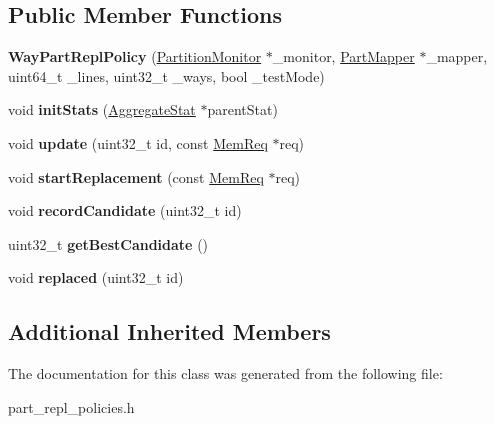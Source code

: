 \subsection*{Public Member Functions}
\begin{DoxyCompactItemize}
\item 
\hypertarget{classWayPartReplPolicy_a6f374286e7e738f7f76f47f87c171a3a}{{\bfseries Way\-Part\-Repl\-Policy} (\hyperlink{classPartitionMonitor}{Partition\-Monitor} $\ast$\-\_\-monitor, \hyperlink{classPartMapper}{Part\-Mapper} $\ast$\-\_\-mapper, uint64\-\_\-t \-\_\-lines, uint32\-\_\-t \-\_\-ways, bool \-\_\-test\-Mode)}\label{classWayPartReplPolicy_a6f374286e7e738f7f76f47f87c171a3a}

\item 
\hypertarget{classWayPartReplPolicy_a63b0823126e72f0ec951dde90c1a9977}{void {\bfseries init\-Stats} (\hyperlink{classAggregateStat}{Aggregate\-Stat} $\ast$parent\-Stat)}\label{classWayPartReplPolicy_a63b0823126e72f0ec951dde90c1a9977}

\item 
\hypertarget{classWayPartReplPolicy_a9372672c88cf0e53f9218836d760c8ff}{void {\bfseries update} (uint32\-\_\-t id, const \hyperlink{structMemReq}{Mem\-Req} $\ast$req)}\label{classWayPartReplPolicy_a9372672c88cf0e53f9218836d760c8ff}

\item 
\hypertarget{classWayPartReplPolicy_af2660add95f97c3e65e2e427c3c9c9fd}{void {\bfseries start\-Replacement} (const \hyperlink{structMemReq}{Mem\-Req} $\ast$req)}\label{classWayPartReplPolicy_af2660add95f97c3e65e2e427c3c9c9fd}

\item 
\hypertarget{classWayPartReplPolicy_a133e827b256bdd9485703968ebc6764e}{void {\bfseries record\-Candidate} (uint32\-\_\-t id)}\label{classWayPartReplPolicy_a133e827b256bdd9485703968ebc6764e}

\item 
\hypertarget{classWayPartReplPolicy_a1bc5d275de4abd8c9a91bcffefdab304}{uint32\-\_\-t {\bfseries get\-Best\-Candidate} ()}\label{classWayPartReplPolicy_a1bc5d275de4abd8c9a91bcffefdab304}

\item 
\hypertarget{classWayPartReplPolicy_ac1fd3a50f831294f63deebf5c078b98b}{void {\bfseries replaced} (uint32\-\_\-t id)}\label{classWayPartReplPolicy_ac1fd3a50f831294f63deebf5c078b98b}

\end{DoxyCompactItemize}
\subsection*{Additional Inherited Members}


The documentation for this class was generated from the following file\-:\begin{DoxyCompactItemize}
\item 
part\-\_\-repl\-\_\-policies.\-h\end{DoxyCompactItemize}

